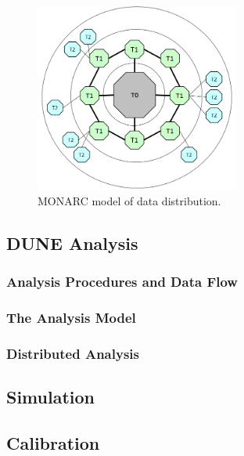 \begin{figure}[h!]
\centering
\includegraphics[width=0.6\textwidth]{monarc-model.png}
\caption{MONARC model of data distribution.}
\label{fig:monarc}
\end{figure}

\subsection{DUNE Analysis}
\subsubsection{Analysis Procedures and Data Flow}
\subsubsection{The Analysis Model}
\subsubsection{Distributed Analysis}

\subsection{Simulation}
\subsection{Calibration}

